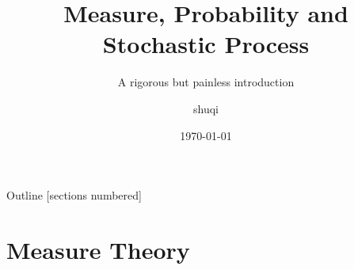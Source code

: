 \documentclass[utf-8, 10pt, aspectratio=1610]{beamer}
\title{Measure, Probability and Stochastic Process}
\subtitle{A rigorous but painless introduction}
\author{shuqi}
\date{\today}
\institute{
    \faGithub\;
    \href{https://github.com/xiaosq2000}{xiaosq2000}
    \quad
    \faEnvelope\;
    \href{xiaosq2000@gmail.com}{xiaosq2000@gmail.com}
}
\begin{document}
\begin{frame}
	\titlepage
\end{frame}


\begin{frame}[allowframebreaks]{Outline}
	[sections numbered]
	\tableofcontents
\end{frame}

\section{Measure Theory}
\end{document}
